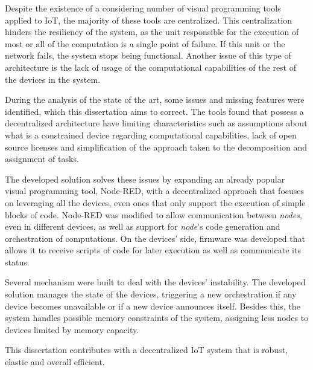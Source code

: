 Despite the existence of a considering number of visual programming tools applied to IoT, the majority of these tools are centralized. This centralization hinders the resiliency of the system, as the unit responsible for the execution of most or all of the computation is a single point of failure. If this unit or the network fails, the system stops being functional. Another issue of this type of architecture is the lack of usage of the computational capabilities of the rest of the devices in the system.

During the analysis of the state of the art, some issues and missing features were identified, which this dissertation aims to correct. The tools found that possess a decentralized architecture have limiting characteristics such as assumptions about what is a constrained device regarding computational capabilities, lack of open source licenses and simplification of the approach taken to the decomposition and assignment of tasks.

The developed solution solves these issues by expanding an already popular visual programming tool, Node-RED, with a decentralized approach that focuses on leveraging all the devices, even ones that only support the execution of simple blocks of code. Node-RED was modified to allow communication between \textit{nodes}, even in different devices, as well as support for \textit{node}'s code generation and orchestration of computations. On the devices' side, firmware was developed that allows it to receive scripts of code for later execution as well as communicate its status. 

Several mechanism were built to deal with the devices' instability. The developed solution manages the state of the devices, triggering a new orchestration if any device becomes unavailable or if a new device announces itself. Besides this, the system handles possible memory constraints of the system, assigning less nodes to devices limited by memory capacity.

This dissertation contributes with a decentralized IoT system that is robust, elastic and overall efficient.